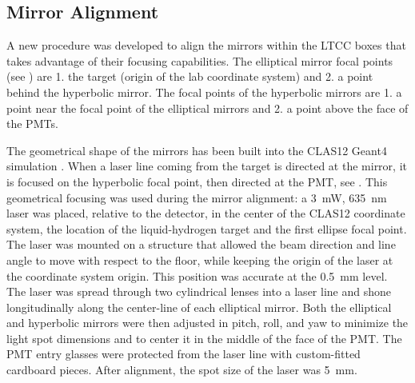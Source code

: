 
\subsection{Mirror Alignment}\label{sec:mirrorAlignment}

A new procedure was developed to align the mirrors within the LTCC boxes that takes advantage of their focusing capabilities.
The elliptical mirror focal points (see ) are 1. the target (origin of the lab coordinate system)
and 2. a point behind the hyperbolic mirror. The focal points of the hyperbolic mirrors are 1. a point near the focal point of the elliptical mirrors and
2. a point above the face of the PMTs.

The geometrical shape of the mirrors has been built into the CLAS12 Geant4 simulation \cite{sim-nim}.
When a laser line coming from the target is directed at the mirror,
it is focused on the hyperbolic focal point, then directed at the PMT, see .
This geometrical focusing was used during the mirror alignment: a 3~mW, 635~nm laser was placed, relative to the
detector,
in the center of the CLAS12 coordinate system, the location of the liquid-hydrogen target and the first ellipse focal point.
The laser was mounted on a structure that allowed the beam direction and line angle to move with respect to the floor, while keeping the origin of the laser at the coordinate system origin.
This position was accurate at the 0.5~mm level. The laser was spread through two cylindrical lenses into a laser line
and shone
longitudinally along the center-line of each elliptical mirror. Both the elliptical and hyperbolic mirrors were then
adjusted in pitch, roll, and yaw to minimize the light spot dimensions and to center it in the middle of the face of the PMT.
The PMT entry glasses were protected from the laser line with custom-fitted cardboard pieces. After alignment, the spot size of the laser was 5~mm.

